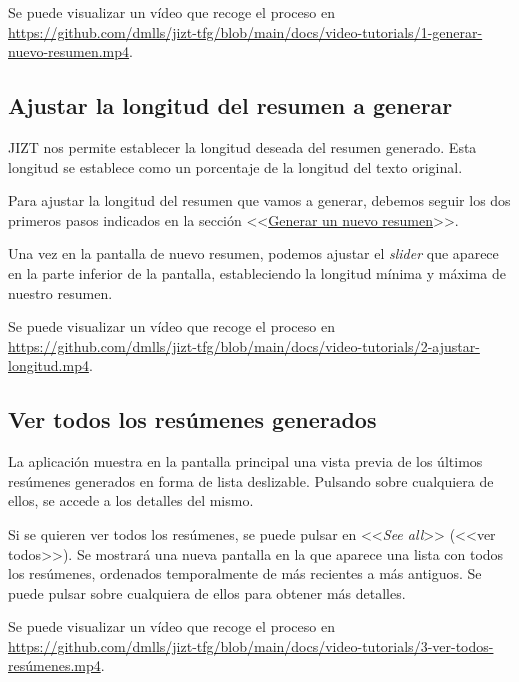 Se puede visualizar un vídeo que recoge el proceso en \href{https://github.com/dmlls/jizt-tfg/blob/main/docs/video-tutorials/1-generar-nuevo-resumen.mp4}{https://github.com/\newline dmlls/jizt-tfg/blob/main/docs/video-tutorials/1-generar-nuevo-resumen.mp4}.

\subsection{Ajustar la longitud del resumen a generar}

JIZT nos permite establecer la longitud deseada del resumen generado. Esta longitud se establece como un porcentaje de la longitud del texto original.

Para ajustar la longitud del resumen que vamos a generar, debemos seguir los dos primeros pasos indicados en la sección <<\hyperref[subsection:nuevo-resumen]{Generar un nuevo resumen}>>.

Una vez en la pantalla de nuevo resumen, podemos ajustar el \emph{slider} que aparece en la parte inferior de la pantalla, estableciendo la longitud mínima y máxima de nuestro resumen.

Se puede visualizar un vídeo que recoge el proceso en \href{https://github.com/dmlls/jizt-tfg/blob/main/docs/video-tutorials/2-ajustar-longitud.mp4}{https://github.com/\newline dmlls/jizt-tfg/blob/main/docs/video-tutorials/2-ajustar-longitud.mp4}.

\subsection{Ver todos los resúmenes generados}

La aplicación muestra en la pantalla principal una vista previa de los últimos resúmenes generados en forma de lista deslizable. Pulsando sobre cualquiera de ellos, se accede a los detalles del mismo.

Si se quieren ver todos los resúmenes, se puede pulsar en <<\emph{See all}>> (<<ver todos>>). Se mostrará una nueva pantalla en la que aparece una lista con todos los resúmenes, ordenados temporalmente de más recientes a más antiguos. Se puede pulsar sobre cualquiera de ellos para obtener más detalles.

Se puede visualizar un vídeo que recoge el proceso en \href{https://github.com/dmlls/jizt-tfg/blob/main/docs/video-tutorials/3-ver-todos-resúmenes.mp4}{https://github.com/\newline dmlls/jizt-tfg/blob/main/docs/video-tutorials/3-ver-todos-resúmenes.mp4}.

